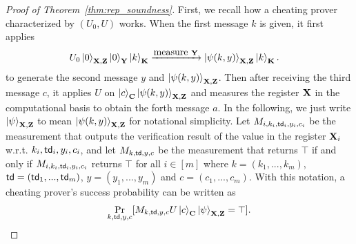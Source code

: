 \begin{proof}[Proof of Theorem~\ref{thm:rep_soundness}]

First, we recall how a cheating prover characterized by $(U_0,U)$ works.
When the first message $k$ is given, it first applies 
\begin{align*}
    &U_0\ket{0}_{\mathbf{X},\mathbf{Z}}\ket{0}_{\mathbf{Y}}\ket{k}_{\mathbf{K}} \xrightarrow{\mbox{measure }\mathbf{Y}} \ket{\psi(k,y)}_{\mathbf{X},\mathbf{Z}}\ket{k}_{\mathbf{K}}.
\end{align*}
to generate the second message $y$ and $\ket{\psi(k,y)}_{\mathbf{X},\mathbf{Z}}$.
Then after receiving the third message $c$, it applies $U$ on $\ket{c}_{\mathbf{C}}\ket{\psi(k,y)}_{\mathbf{X},\mathbf{Z}}$ and measures the register $\mathbf{X}$ in the computational basis to obtain the forth message $a$.
In the following, we just write $\ket{\psi}_{\mathbf{X},\mathbf{Z}}$ to mean $\ket{\psi(k,y)}_{\mathbf{X},\mathbf{Z}}$ for notational simplicity.
Let $M_{i,k_i,\mathsf{td}_i,y_i,c_i}$ be the measurement that outputs the verification result of the value in the register $\mathbf{X}_i$ w.r.t.  $k_i,\mathsf{td}_i,y_i,c_i$, and let $M_{k,\mathsf{td},y,c}$ be the measurement that returns $\top$ if and only if $M_{i,k_i,\mathsf{td}_i,y_i,c_i}$ returns $\top$ for all $i\in[m]$ where $k=(k_1,...,k_m)$, $\mathsf{td}=(\mathsf{td}_1,...,\mathsf{td}_m)$, $y=(y_1,...,y_m)$ and $c=(c_1,...,c_m)$.
With this notation, a cheating prover's success probability can be written as 
\begin{align*}
    \Pr_{k,\mathsf{td},y,c}[M_{k,\mathsf{td},y,c}U\ket{c}_{\mathbf{C}}\ket{\psi}_{\mathbf{X},\mathbf{Z}} = \top].
\end{align*}


\end{proof}
